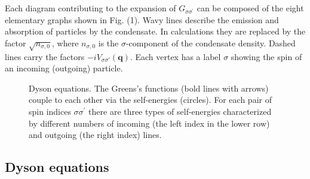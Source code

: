 \documentclass[reprint,superscriptaddress,showpacs,nofootinbib,aps,pra]{revtex4-1}
\begin{document}
Each diagram contributing to the expansion of $G_{\sigma\sigma^\prime}$ can be composed of the eight elementary graphs shown in Fig. (1). Wavy lines describe the emission and absorption of particles by the condensate. In calculations they are replaced by the factor $\sqrt{n_{\sigma,0}}$, where $n_{\sigma,0}$ is the $\sigma$-component of the condensate density. Dashed lines carry the factors $-iV_{\sigma\sigma'}(\bm q)$. Each vertex has a label $\sigma$ showing the spin of an incoming (outgoing) particle.

\begin{figure*}[t]
  \noindent{}
  \caption{Dyson equations. The Greens's functions (bold lines with arrows) couple to each other via the self-energies (circles). For each pair of spin indices $\sigma\sigma^\prime$ there are three types of self-energies characterized by different numbers of incoming (the left index in the lower row) and outgoing (the right index) lines.}
  \label{Dyson}
\end{figure*} 

\subsection{Dyson equations}
\end{document}
